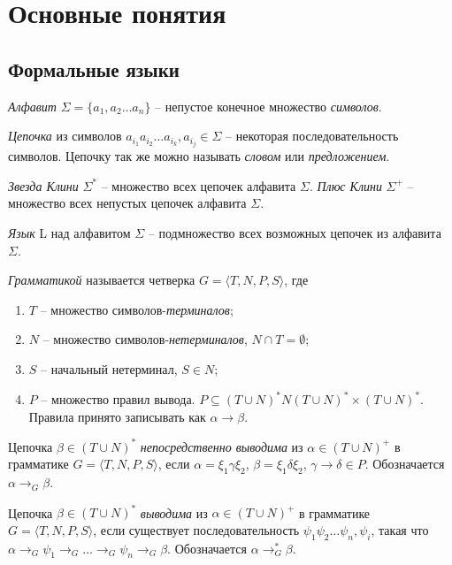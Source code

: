 
\chapter{Основные понятия} \label{chapter1}

\section{Формальные языки}

\emph{Алфавит} $\Sigma = \{ a_1, a_2 \dots a_n \}$ -- непустое конечное множество \emph{символов}.

\emph{Цепочка} из символов $a_{i_1} a_{i_2} \dots a_{i_k}, a_{i_j} \in \Sigma$ -- некоторая последовательность символов.
Цепочку так же можно называть \emph{словом} или \emph{предложением}.

\emph{Звезда Клини} $\Sigma^*$ -- множество всех цепочек алфавита $\Sigma$.
\emph{Плюс Клини} $\Sigma^+$ -- множество всех непустых цепочек алфавита $\Sigma$.

\emph{Язык} L над алфавитом $\Sigma$ -- подмножество всех возможных цепочек из алфавита $\Sigma$.

\emph{Грамматикой} называется четверка $G = \langle T, N, P, S \rangle$, где
\begin{enumerate}[label=\arabic*)]
    \item $T$ -- множество символов-\emph{терминалов};
    \item $N$ -- множество символов-\emph{нетерминалов}, $N \cap T = \emptyset$;
    \item $S$ -- начальный нетерминал, $S \in N$;
    \item {
        $P$ -- множество правил вывода. $P \subseteq (T \cup N)^*N(T \cup N)^* \times (T \cup N)^*$.
        Правила принято записывать как $\alpha \rightarrow \beta$.
    }
\end{enumerate}

Цепочка $\beta \in (T \cup N)^*$ \emph{непосредственно выводима} из $\alpha \in (T \cup N)^+$ в 
грамматике $G = \langle T, N, P, S \rangle$,
если $\alpha = \xi_1 \gamma \xi_2$, $\beta = \xi_1 \delta \xi_2$, $\gamma \rightarrow \delta \in P$.
Обозначается $\alpha \rightarrow_G \beta$.

Цепочка $\beta \in (T \cup N)^*$ \emph{выводима} из $\alpha \in (T \cup N)^+$ в 
грамматике $G = \langle T, N, P, S \rangle$, если существует последовательность
$\psi_1 \psi_2 \dots \psi_n, \psi_i$, такая что $\alpha \rightarrow_G \psi_1 \rightarrow_G \dots \rightarrow_G \psi_n \rightarrow_G \beta$. Обозначается $\alpha \rightarrow_G^* \beta$.

